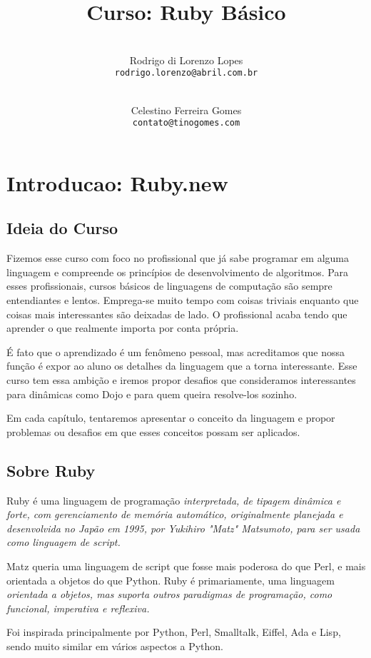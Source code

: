\documentclass[serif,mathserif]{book}
\author{ 
    \\ Rodrigo di Lorenzo Lopes \\  \texttt{rodrigo.lorenzo@abril.com.br}
	\and 
    \\ Celestino Ferreira Gomes \\ \texttt{contato@tinogomes.com}
}
\title{Curso: Ruby Básico}
\begin{document}
\renewcommand*{\toclevel@chapter}{-1}

\maketitle
 
\tableofcontents

\chapter{Introducao: Ruby.new}

\section{Ideia do Curso}
Fizemos esse curso com foco no profissional que já sabe programar em alguma linguagem e compreende
os princípios de desenvolvimento de algoritmos. Para esses profissionais, cursos básicos de linguagens de computação
são sempre entendiantes e lentos. Emprega-se muito tempo com coisas triviais enquanto que coisas mais interessantes
são deixadas de lado. O profissional acaba tendo que aprender o que realmente importa por conta própria.

É fato que o aprendizado é um fenômeno pessoal, mas acreditamos que nossa função é expor ao aluno os 
detalhes da linguagem que a torna interessante. Esse curso tem essa ambição e iremos propor desafios 
que consideramos interessantes para dinâmicas como Dojo e para quem queira resolve-los sozinho.

Em cada capítulo, tentaremos apresentar o conceito da linguagem e propor problemas ou desafios em que esses conceitos
possam  ser aplicados. 

\section{Sobre Ruby}
Ruby é uma linguagem de programação \em{interpretada}, de \em{tipagem dinâmica} e \em{forte}, com \em{gerenciamento de memória automático},
 originalmente planejada e desenvolvida no Japão em 1995, por Yukihiro "Matz" Matsumoto, para ser usada como linguagem de script.

Matz queria uma linguagem de script que fosse mais poderosa do que Perl, e mais orientada a objetos do que Python.
Ruby é primariamente, uma linguagem \em{orientada a objetos}, mas suporta outros paradigmas de programação,
como \em{funcional}, \em{imperativa}  e \em{reflexiva}.

Foi inspirada principalmente por Python, Perl, Smalltalk, Eiffel, Ada e Lisp, sendo muito similar em vários aspectos a Python.
\end{document}
